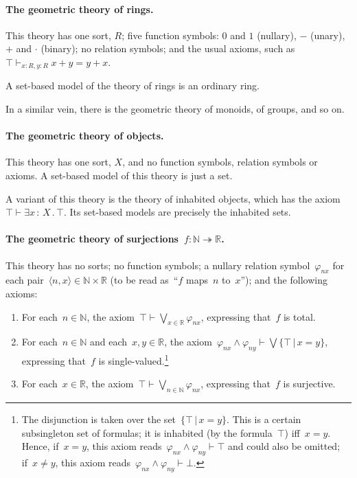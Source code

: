 \documentclass{ws-rv9x6}
\newcommand{\NN}{\mathbb{N}}
\newcommand{\RR}{\mathbb{R}}
\renewcommand{\_}{\mathpunct{.}}
\newcommand{\?}{\,{:}\,}
\begin{document}
\paragraph{The geometric theory of rings.} This theory has one sort, $R$; five function symbols:
$0$ and $1$ (nullary), $-$ (unary), $+$ and $\cdot$ (binary); no relation
symbols; and the usual axioms, such as $\top \vdash_{x:R,y:R} x + y = y + x$.

A set-based model of the theory of rings is an ordinary ring.

In a similar vein, there is the geometric theory of monoids, of groups, and so
on.

\paragraph{The geometric theory of objects.} This theory has one sort, $X$, and no function
symbols, relation symbols or axioms. A set-based model of this theory is just a
set.

A variant of this theory is the theory of inhabited objects, which has the
axiom~$\top \vdash \exists x\?X\_ \top$. Its set-based models are precisely the
inhabited sets.

\paragraph{The geometric theory of surjections~$f : \NN \twoheadrightarrow
\RR$.} This theory has no
sorts; no function symbols; a nullary relation symbol~$\varphi_{nx}$ for each
pair~$\langle n,x \rangle \in \NN \times \RR$ (to be read as~``$f$ maps~$n$
to~$x$''); and the following axioms:
\begin{enumerate}
\item For each~$n \in \NN$, the axiom~$\top \vdash \bigvee_{x \in \RR}
\varphi_{nx}$, expressing that~$f$ is total.
\item For each~$n \in \NN$ and each~$x,y \in \RR$, the axiom~$\varphi_{nx}
\wedge \varphi_{ny} \vdash \bigvee\{ \top \,|\, x = y \}$,
expressing that~$f$ is single-valued.\footnote{The disjunction is taken over
the set~$\{ \top \,|\, x = y \}$. This is a certain subsingleton set of
formulas; it is inhabited (by the formula~$\top$) iff~$x = y$. Hence, if~$x =
y$, this axiom reads~$\varphi_{nx}
\wedge \varphi_{ny} \vdash \top$ and could also be omitted; if~$x \neq y$,
this axiom reads~$\varphi_{nx} \wedge \varphi_{ny} \vdash \bot$.}
\item For each~$x \in \RR$, the axiom~$\top \vdash \bigvee_{n \in \NN}
\varphi_{nx}$, expressing that~$f$ is surjective.
\end{enumerate}
\end{document}
